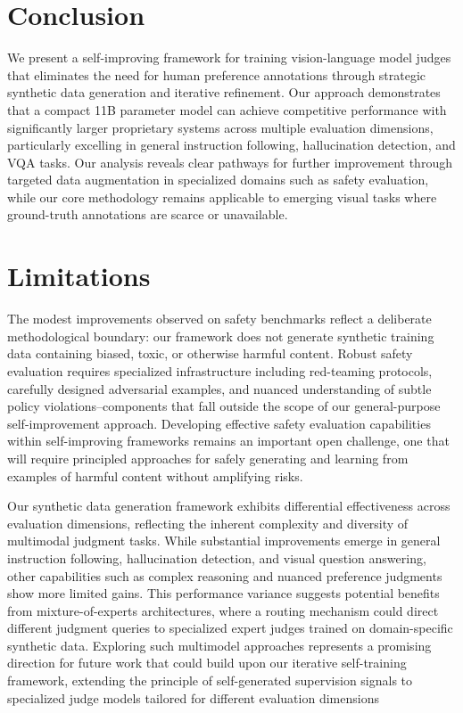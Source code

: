 \section{Conclusion}

We present a self-improving framework for training vision-language model judges that eliminates the need for human preference annotations through strategic synthetic data generation and iterative refinement. Our approach demonstrates that a compact 11B parameter model can achieve competitive performance with significantly larger proprietary systems across multiple evaluation dimensions, particularly excelling in general instruction following, hallucination detection, and VQA tasks. Our analysis reveals clear pathways for further improvement through targeted data augmentation in specialized domains such as safety evaluation, while our core methodology remains applicable to emerging visual tasks where ground-truth annotations are scarce or unavailable.

\section*{Limitations}

 The modest improvements observed on safety benchmarks reflect a deliberate methodological boundary: our framework does not generate synthetic training data containing biased, toxic, or otherwise harmful content. Robust safety evaluation requires specialized infrastructure including red-teaming protocols, carefully designed adversarial examples, and nuanced understanding of subtle policy violations--components that fall outside the scope of our general-purpose self-improvement approach. Developing effective safety evaluation capabilities within self-improving frameworks remains an important open challenge, one that will require principled approaches for safely generating and learning from examples of harmful content without amplifying risks.

 Our synthetic data generation framework exhibits differential effectiveness across evaluation dimensions, reflecting the inherent complexity and diversity of multimodal judgment tasks. While substantial improvements emerge in general instruction following, hallucination detection, and visual question answering, other capabilities such as complex reasoning and nuanced preference judgments show more limited gains. This performance variance suggests potential benefits from mixture-of-experts architectures, where a routing mechanism could direct different judgment queries to specialized expert judges trained on domain-specific synthetic data. Exploring such multimodel approaches represents a promising direction for future work that could build upon our iterative self-training framework, extending the principle of self-generated supervision signals to specialized judge models tailored for different evaluation dimensions